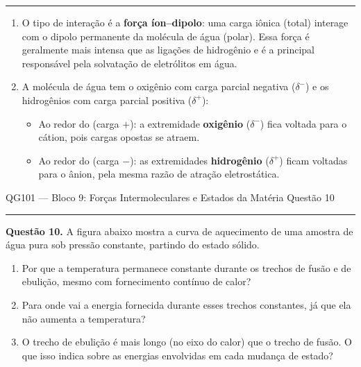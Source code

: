 \documentclass[10pt,a4paper]{article}
\newcommand{\questaoheader}[1]{%
  \begin{center}
  {\small\sffamily QG101 --- Bloco 9: Forças Intermoleculares e Estados da Matéria
  \hfill Questão #1}
  \end{center}
  \vspace{-0.3cm}
  \noindent\rule{\textwidth}{0.6pt}
  \vspace{0.1cm}
}
\newcommand{\resolucaosep}{%
  \vspace{0.4cm}
  \noindent\rule{\textwidth}{0.4pt}
  \vspace{0.1cm}

  \noindent{\bf Resolução:}
  \vspace{0.2cm}
}
\begin{document}
\resolucaosep

\begin{enumerate}
  \item O tipo de interação é a \textbf{força íon--dipolo}: uma carga
        iônica (total) interage com o dipolo permanente da molécula de água
        (polar). Essa força é geralmente mais intensa que as ligações de
        hidrogênio e é a principal responsável pela solvatação de eletrólitos
        em água.

  \item A molécula de água tem o oxigênio com carga parcial negativa
        ($\delta^-$) e os hidrogênios com carga parcial positiva ($\delta^+$):
        \begin{itemize}
          \item Ao redor do  (carga $+$): a extremidade
                \textbf{oxigênio} ($\delta^-$) fica voltada para o cátion,
                pois cargas opostas se atraem.
          \item Ao redor do  (carga $-$): as extremidades
                \textbf{hidrogênio} ($\delta^+$) ficam voltadas para o
                ânion, pela mesma razão de atração eletrostática.
        \end{itemize}
\end{enumerate}

\clearpage

\questaoheader{10}

\noindent\textbf{Questão 10.}
A figura abaixo mostra a curva de aquecimento de uma amostra de água pura
sob pressão constante, partindo do estado sólido.

\begin{center}

\end{center}

\begin{enumerate}
  \item Por que a temperatura permanece constante durante os trechos de
        fusão e de ebulição, mesmo com fornecimento contínuo de calor?
  \item Para onde vai a energia fornecida durante esses trechos
        constantes, já que ela não aumenta a temperatura?
  \item O trecho de ebulição é mais longo (no eixo do calor) que o trecho
        de fusão. O que isso indica sobre as energias envolvidas em cada
        mudança de estado?
\end{enumerate}
\end{document}
